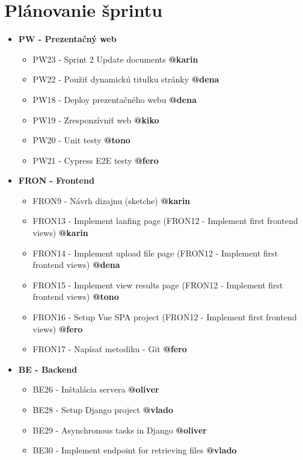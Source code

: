 \documentclass{article}
\begin{document}
    \section*{Plánovanie šprintu}

    \begin{itemize}
    \item \textbf {PW - Prezentačný web} 
        \begin{itemize}
            \item PW23 - Sprint 2 Update documents \textbf {@karin}
            \item PW22 - Použiť dynamickú titulku stránky \textbf {@dena}
            \item PW18 - Deploy prezentačného webu \textbf {@dena}
            \item PW19 - Zresponzívniť web \textbf {@kiko}
            \item PW20 - Unit testy \textbf {@tono}
            \item PW21 - Cypress E2E testy \textbf {@fero}
        \end{itemize}
    \item \textbf {FRON - Frontend} 
        \begin{itemize}
            \item FRON9 - Návrh dizajnu (sketche) \textbf {@karin}
            \item FRON13 - Implement lanfing page (FRON12 - Implement first frontend views) \textbf {@karin}
            \item FRON14 - Implement upload file page (FRON12 - Implement first frontend views) \textbf {@dena}
            \item FRON15 - Implement view results page (FRON12 - Implement first frontend views) \textbf {@tono}
            \item FRON16 - Setup Vue SPA project (FRON12 - Implement first frontend views) \textbf {@fero}
            \item FRON17 - Napísať metodiku - Git \textbf {@fero}
        \end{itemize}
        
    \item \textbf {BE - Backend} 
        \begin{itemize}
            \item BE26 - Inštalácia servera \textbf {@oliver}
            \item BE28 - Setup Django project \textbf {@vlado}
            \item BE29 - Asynchronous tasks in Django \textbf {@oliver}
            \item BE30 - Implement endpoint for retrieving files \textbf {@vlado}
        \end{itemize}        
    \end{itemize}
\end{document}
